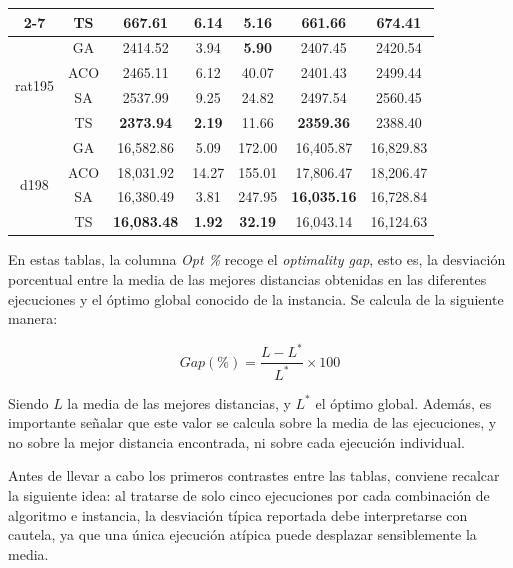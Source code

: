 \begin{table}[H]
\begin{center}
\begin{tabular}{|c|c|c|c|c|c|c|}
            \cline{2-7}
            & TS & \textbf{667.61} & \textbf{6.14} & 5.16 & \textbf{661.66} & 674.41 \\
            \hline
            \multirow{4}{*}{rat195} & GA & 2414.52 & 3.94 & \textbf{5.90} & 2407.45 & 2420.54 \\
            \cline{2-7}
            & ACO & 2465.11 & 6.12 & 40.07 & 2401.43 & 2499.44 \\
            \cline{2-7}
            & SA & 2537.99 & 9.25 & 24.82 & 2497.54 & 2560.45 \\
            \cline{2-7}
            & TS & \textbf{2373.94} & \textbf{2.19} & 11.66 & \textbf{2359.36} & 2388.40 \\
            \hline
            \multirow{4}{*}{d198} & GA & 16,582.86 & 5.09 & 172.00 & 16,405.87 & 16,829.83 \\
            \cline{2-7}
            & ACO & 18,031.92 & 14.27 & 155.01 & 17,806.47 & 18,206.47 \\
            \cline{2-7}
            & SA & 16,380.49 & 3.81 & 247.95 & \textbf{16,035.16} & 16,728.84 \\
            \cline{2-7}
            & TS & \textbf{16,083.48} & \textbf{1.92} & \textbf{32.19} & 16,043.14 & 16,124.63 \\
            \hline
        \end{tabular}
    \end{center}
\end{table}

En estas tablas, la columna \textit{Opt \%} recoge el \textit{optimality gap}, esto es, la desviación porcentual entre
la media de las mejores distancias obtenidas en las diferentes ejecuciones y el óptimo global conocido de la instancia. Se
calcula de la siguiente manera:

\begin{equation}
    Gap (\%) = \frac{L - L^*}{L^*} \times 100
\end{equation}

Siendo $L$ la media de las mejores distancias, y $L^*$ el óptimo global. Además, es importante señalar que este valor se calcula
sobre la media de las ejecuciones, y no sobre la mejor distancia encontrada, ni sobre cada ejecución individual.

Antes de llevar a cabo los primeros contrastes entre las tablas, conviene recalcar la siguiente idea: al tratarse de solo cinco
ejecuciones por cada combinación de algoritmo e instancia, la desviación típica reportada debe interpretarse con cautela, ya 
que una única ejecución atípica puede desplazar sensiblemente la media.

